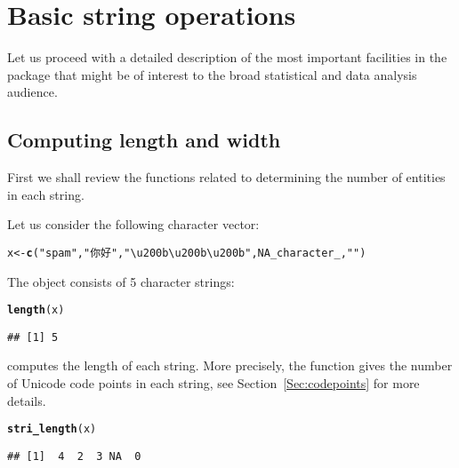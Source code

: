 \documentclass[nojss]{jss}\usepackage[]{graphicx}\usepackage[]{xcolor}
\makeatletter
\newcommand{\hlnum}[1]{\textcolor[rgb]{0.686,0.059,0.569}{#1}}%
\newcommand{\hlstr}[1]{\textcolor[rgb]{0.192,0.494,0.8}{#1}}%
\newcommand{\hlstd}[1]{\textcolor[rgb]{0.345,0.345,0.345}{#1}}%
\newcommand{\hlkwb}[1]{\textcolor[rgb]{0.69,0.353,0.396}{#1}}%
\newcommand{\hlkwd}[1]{\textcolor[rgb]{0.737,0.353,0.396}{\textbf{#1}}}%
\newenvironment{kframe}{%
 \def\at@end@of@kframe{}%
 \ifinner\ifhmode%
  \def\at@end@of@kframe{\end{minipage}}%
  \begin{minipage}{\columnwidth}%
 \fi\fi%
 \def\FrameCommand##1{\hskip\@totalleftmargin \hskip-\fboxsep
 \colorbox{shadecolor}{##1}\hskip-\fboxsep
     \hskip-\linewidth \hskip-\@totalleftmargin \hskip\columnwidth}%
 \MakeFramed {\advance\hsize-\width
   \@totalleftmargin\z@ \linewidth\hsize
   \@setminipage}}%
 {\par\unskip\endMakeFramed%
 \at@end@of@kframe}
\newenvironment{knitrout}{}{} %
\makeatother
\begin{document}
\section{Basic string operations}\label{Sec:basic}

Let us proceed with a detailed description of the most important
facilities in the  package that might be of interest to
the broad statistical and data analysis audience.



\subsection{Computing length and width}


First we shall review the functions related to determining
the number of entities in each string.



Let us consider the following character vector:

\begin{knitrout}
\color{fgcolor}\begin{kframe}
\begin{alltt}
\hlstd{x} \hlkwb{<-} \hlkwd{c}\hlstd{(}\hlstr{"spam"}\hlstd{,} \hlstr{"你好"}\hlstd{,} \hlstr{"\textbackslash{}u200b\textbackslash{}u200b\textbackslash{}u200b"}\hlstd{,} \hlnum{NA_character_}\hlstd{,} \hlstr{""}\hlstd{)}
\end{alltt}
\end{kframe}
\end{knitrout}

The  object consists of 5 character strings:

\begin{knitrout}
\color{fgcolor}\begin{kframe}
\begin{alltt}
\hlkwd{length}\hlstd{(x)}
\end{alltt}
\begin{verbatim}
## [1] 5
\end{verbatim}
\end{kframe}
\end{knitrout}


 computes the length of each string.
More precisely, the function gives the number of Unicode code points
in each string, see Section~\ref{Sec:codepoints} for more details.

\begin{knitrout}
\color{fgcolor}\begin{kframe}
\begin{alltt}
\hlkwd{stri_length}\hlstd{(x)}
\end{alltt}
\begin{verbatim}
## [1]  4  2  3 NA  0
\end{verbatim}
\end{kframe}
\end{knitrout}
\end{document}

